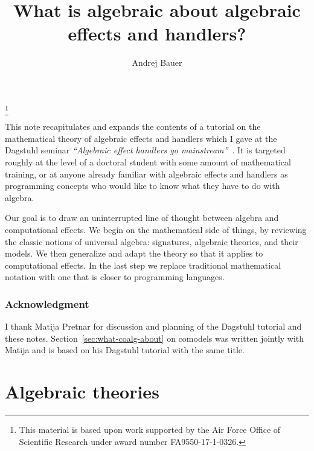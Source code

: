 \documentclass{amsart}
\begin{document}
\title{What is algebraic about algebraic effects and handlers?}

\author{Andrej Bauer}
\address{Andrej Bauer\\
Faculty of mathematics and Physics\\
University of Ljubljana\\
Jadranska 19\\
1000 Ljubljana\\
Slovenia}
\thanks{This material is based upon work supported by the Air Force Office of
  Scientific Research under award number FA9550-17-1-0326.}

\maketitle

This note recapitulates and expands the contents of a tutorial on the
mathematical theory of algebraic effects and handlers which I gave at the
Dagstuhl seminar \emph{``Algebraic effect handlers go
  mainstream''}~\cite{chandrasekaran18:_algeb}. It is targeted roughly at the
level of a doctoral student with some amount of mathematical training, or at
anyone already familiar with algebraic effects and handlers as programming
concepts who would like to know what they have to do with algebra.

Our goal is to draw an uninterrupted line of thought between algebra and
computational effects. We begin on the mathematical side of things, by reviewing
the classic notions of universal algebra: signatures, algebraic theories, and
their models. We then generalize and adapt the theory so that it applies to
computational effects. In the last step we replace traditional mathematical
notation with one that is closer to programming languages.

\subsubsection*{Acknowledgment}

I thank Matija Pretnar for discussion and planning of the Dagstuhl tutorial and
these notes. Section~\ref{sec:what-coalg-about} on comodels was written jointly
with Matija and is based on his Dagstuhl tutorial with the same title.


\section{Algebraic theories}
\label{sec:algebraic-theories}
\end{document}
